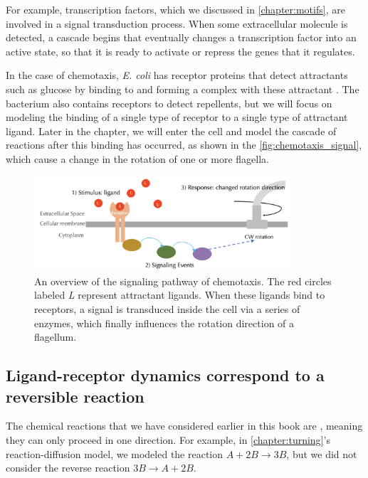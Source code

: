 For example, transcription factors, which we discussed in \autoref{chapter:motifs}, are involved in a signal transduction process. When some extracellular molecule is detected, a cascade begins that eventually changes a transcription factor into an active state, so that it is ready to activate or repress the genes that it regulates.

In the case of chemotaxis, \textit{E. coli} has receptor proteins that detect attractants such as glucose by binding to and forming a complex with these attractant . The bacterium also contains receptors to detect repellents, but we will focus on modeling the binding of a single type of receptor to a single type of attractant ligand. Later in the chapter, we will enter the cell and model the cascade of reactions after this binding has occurred, as shown in the \autoref{fig:chemotaxis_signal}, which cause a change in the rotation of one or more flagella.

\begin{figure}[h]
\centering
\mySfFamily
\includegraphics[width = 0.85\textwidth]{../images/chemotaxis_signal.png}
\caption{An overview of the signaling pathway of chemotaxis. The red circles labeled \textit{L} represent attractant ligands. When these ligands bind to receptors, a signal is transduced inside the cell via a series of enzymes, which finally influences the rotation direction of a flagellum.}
\label{fig:chemotaxis_signal}
\end{figure}

\FloatBarrier
\nopagebreak
{}
\subsection{Ligand-receptor dynamics correspond to a reversible reaction}

The chemical reactions that we have considered earlier in this book are , meaning they can only proceed in one direction. For example, in \autoref{chapter:turning}'s reaction-diffusion model, we modeled the reaction $A + 2B \rightarrow 3B$, but we did not consider the reverse reaction $3B \rightarrow A + 2B$.


